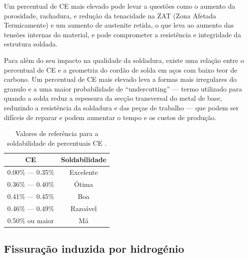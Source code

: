 Um percentual de CE mais elevado pode levar a questões como o aumento da porosidade, rachadura, e redução da tenacidade na ZAT (Zona Afetada Termicamente)\cite{Karsamas2003} e um aumento de austenite retida\cite{Park2018}, o que leva ao aumento das tensões internas do material, e pode comprometer a resistência e integridade da estrutura soldada.
\par
Para além do seu impacto na qualidade da soldadura, existe uma relação entre o percentual de  CE e a geometria do cordão de solda em aços com baixo teor de carbono. Um percentual de CE mais elevado leva a formas mais irregulares do granulo e a uma maior probabilidade de “undercutting” — termo utilizado para quando a solda reduz a espessura da secção transversal do metal de base, reduzindo a resistência da soldadura e das peças de trabalho — que podem ser difíceis de reparar e podem aumentar o tempo e os custos de produção.
\begin{table}[htb]
    \centering
    \caption[Valores de referência para a soldabilidade de percentuais CE]%
    {Valores de referência para a soldabilidade de percentuais CE \cite{Vladimir2000}.}
    \label{tab:CE}
    \begin{tabular}{cc} 
    \toprule
    CE              & Soldabilidade  \\ 
    \hline\hline
    0.00\% — 0.35\% & Excelente      \\
    0.36\% — 0.40\% & Ótima          \\
    0.41\% — 0.45\% & Boa            \\
    0.46\% — 0.49\% & Razoável       \\
    0.50\% ou maior & Má             \\
    \bottomrule
    \end{tabular}
\end{table}
\subsection{Fissuração induzida por hidrogénio}\label{ssec:soldadura-fissuracao}


